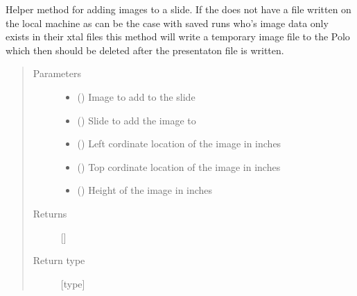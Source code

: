 \documentclass[letterpaper,10pt,english]{sphinxmanual}
\begin{document}
\begin{fulllineitems}
\begin{fulllineitems}
\label{\detokenize{polo.utils:polo.utils.io_utils.PptxWriter.add_image_to_slide}}
Helper method for adding images to a slide. If the 
does not have a file written on the local machine as can be
the case with saved runs who’s image data only exists in
their xtal files this method will write a temporary image
file to the Polo  which then should be deleted after
the presentaton file is written.
\begin{quote}\begin{description}
\item[{Parameters}] \leavevmode\begin{itemize}
\item {} 
 ({\hyperref[\detokenize{polo.crystallography:polo.crystallography.image.Image}]{}}) \textendash{} Image to add to the slide

\item {} 
 () \textendash{} Slide to add the image to

\item {} 
 () \textendash{} Left cordinate location of the image in inches

\item {} 
 () \textendash{} Top cordinate location of the image in inches

\item {} 
 () \textendash{} Height of the image in inches

\end{itemize}

\item[{Returns}] \leavevmode
{[}{]}

\item[{Return type}] \leavevmode
{[}type{]}


\end{description}
\end{quote}
\end{fulllineitems}
\end{fulllineitems}
\end{document}
